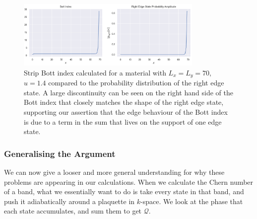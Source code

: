 \begin{figure}[t]
\begin{center}
 \includegraphics[width=0.8\textwidth]{edge_bott}
\caption{Strip Bott index calculated for a material with $L_x  = L_y = 70$, $u = 1.4$ compared to the probability distribution of the right edge state. A large discontinuity can be seen on the right hand side of the Bott index that closely matches the shape of the right edge state, supporting our assertion that the edge behaviour of the Bott index is due to a term in the sum that lives on the support of one edge state.}
\label{fig:edge_bott}
\end{center}
\end{figure}

\subsubsection{Generalising the Argument}
We can now give a looser and more general understanding for why these problems are appearing in our calculations. When we calculate the Chern number of a band, what we essentially want to do is take every state in that band, and push it adiabatically around a plaquette in $k$-space. We look at the phase that each state accumulates, and sum them to get $\mathcal Q$.


